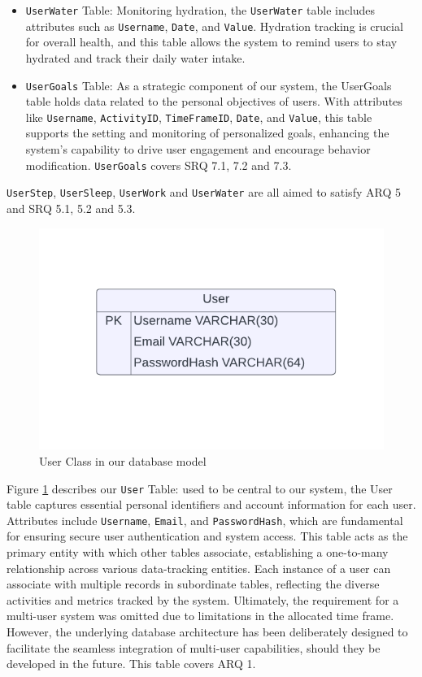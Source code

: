 \documentclass[12pt]{article}
\begin{document}
\begin{itemize}
    \item \texttt{UserWater} Table: Monitoring hydration, the \texttt{UserWater} table
        includes attributes such as \texttt{Username}, \texttt{Date}, and \texttt{Value}. Hydration
        tracking is crucial for overall health, and this table allows the
        system to remind users to stay hydrated and track their daily water
        intake.\par

    \item \texttt{UserGoals} Table: As a strategic component of our system, the
        UserGoals table holds data related to the personal objectives of users.
        With attributes like \texttt{Username}, \texttt{ActivityID}, \texttt{TimeFrameID}, \texttt{Date}, and
        \texttt{Value}, this table supports the setting and monitoring of personalized
        goals, enhancing the system's capability to drive user engagement and
        encourage behavior modification. \texttt{UserGoals} covers SRQ 7.1, 7.2 and
        7.3.\par

\end{itemize}

\texttt{UserStep}, \texttt{UserSleep}, \texttt{UserWork} and \texttt{UserWater}
are all aimed to satisfy ARQ 5 and SRQ 5.1, 5.2 and 5.3.

\begin{figure}[!ht]
  \centering
  \includegraphics[width = 0.4\linewidth]{PI Systems Database-2}
  \caption{User Class in our database model}
  \label{fig:User_Table}
\end{figure}

Figure \ref{fig:User_Table} describes our \texttt{User} Table: used to be
central to our system, the User table captures essential personal identifiers and
account information for each user. Attributes include \texttt{Username}, \texttt{Email}, and
\texttt{PasswordHash}, which are fundamental for ensuring secure user authentication and
system access. This table acts as the primary entity with which other tables
associate, establishing a one-to-many relationship across various data-tracking
entities. Each instance of a user can associate with multiple records in
subordinate tables, reflecting the diverse activities and metrics tracked by the
system. Ultimately, the requirement for a multi-user system was omitted due to
limitations in the allocated time frame. However, the underlying database
architecture has been deliberately designed to facilitate the seamless
integration of multi-user capabilities, should they be developed in the future.
This table covers ARQ 1.
\end{document}
